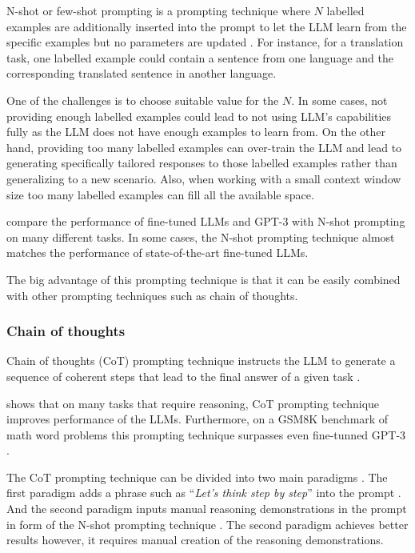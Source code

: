 N-shot or few-shot prompting is a prompting technique where $N$ labelled examples are additionally inserted into the prompt to let the LLM learn from the specific examples but no parameters are updated \cite{Brown2020}. For instance, for a translation task, one labelled example could contain a sentence from one language and the corresponding translated sentence in another language.

One of the challenges is to choose suitable value for the $N$. In some cases, not providing enough labelled examples could lead to not using LLM's capabilities fully as the LLM does not have enough examples to learn from. On the other hand, providing too many labelled examples can over-train the LLM and lead to generating specifically tailored responses to those labelled examples rather than generalizing to a new scenario. Also, when working with a small context window size too many labelled examples can fill all the available space.

\citet{Brown2020} compare the performance of fine-tuned LLMs and GPT-3 with N-shot prompting on many different tasks. In some cases, the N-shot prompting technique almost matches the performance of state-of-the-art fine-tuned LLMs.

The big advantage of this prompting technique is that it can be easily combined with other prompting techniques such as chain of thoughts.


\subsubsection{Chain of thoughts}

Chain of thoughts (CoT) prompting technique instructs the LLM to generate a sequence of coherent steps that lead to the final answer of a given task \cite{Wei2022}.

\citet{Wei2022} shows that on many tasks that require reasoning, CoT prompting technique improves performance of the LLMs. Furthermore, on a GSM8K benchmark of math word problems this prompting technique surpasses even fine-tunned GPT-3 \cite{Wei2022}.

The CoT prompting technique can be divided into two main paradigms \cite{Zhang2022}. The first paradigm adds a phrase such as ``\textit{Let's think step by step}'' into the prompt \cite{Kojima2022}. And the second paradigm inputs manual reasoning demonstrations in the prompt in form of the N-shot prompting technique \cite{Wei2022}. 
The second paradigm achieves better results \cite{Wei2022} however, it requires manual creation of the reasoning demonstrations.

